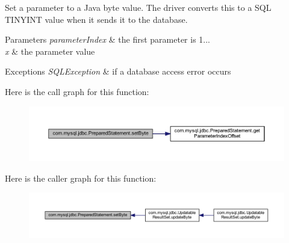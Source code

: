 Set a parameter to a Java byte value. The driver converts this to a S\+QL T\+I\+N\+Y\+I\+NT value when it sends it to the database.


\begin{DoxyParams}{Parameters}
{\em parameter\+Index} & the first parameter is 1... \\
\hline
{\em x} & the parameter value\\
\hline
\end{DoxyParams}

\begin{DoxyExceptions}{Exceptions}
{\em S\+Q\+L\+Exception} & if a database access error occurs \\
\hline
\end{DoxyExceptions}
Here is the call graph for this function\+:
\nopagebreak
\begin{figure}[H]
\begin{center}
\leavevmode
\includegraphics[width=350pt]{classcom_1_1mysql_1_1jdbc_1_1_prepared_statement_a77b76109f1a5e97036a8a82de590efc5_cgraph}
\end{center}
\end{figure}
Here is the caller graph for this function\+:
\nopagebreak
\begin{figure}[H]
\begin{center}
\leavevmode
\includegraphics[width=350pt]{classcom_1_1mysql_1_1jdbc_1_1_prepared_statement_a77b76109f1a5e97036a8a82de590efc5_icgraph}
\end{center}
\end{figure}
\mbox{\label{classcom_1_1mysql_1_1jdbc_1_1_prepared_statement_aaaac7a11d71f1c60bc57f96271582061}} 

